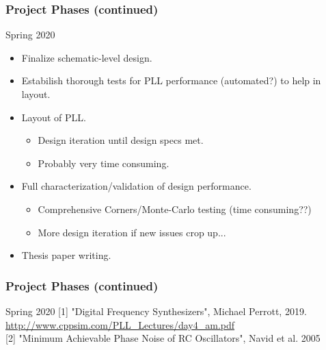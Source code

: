 \documentclass[t, screen, aspectratio=43]{beamer}
\begin{document}
\begin{frame}
	\frametitle{Project Phases (continued)}
	\begin{block}{Spring 2020}
		\begin{itemize}
			\footnotesize
			\item Finalize schematic-level design.
			\item Estabilish thorough tests for PLL performance (automated?) to help in layout.
			\item Layout of PLL.
			\begin{itemize}
				\footnotesize
				\item Design iteration until design specs met.
				\item Probably very time consuming.
			\end{itemize}
			\item Full characterization/validation of design performance. 
			\begin{itemize}
				\footnotesize
				\item Comprehensive Corners/Monte-Carlo testing (time consuming??)
				\item More design iteration if new issues crop up...
			\end{itemize}
			\item Thesis paper writing.
		\end{itemize}
	\end{block}
\end{frame}



\begin{frame}
	\frametitle{Project Phases (continued)}
	\begin{block}{Spring 2020}
		[1] "Digital Frequency Synthesizers", Michael Perrott, 2019.\\
		\hspace{16pt}\url{http://www.cppsim.com/PLL_Lectures/day4_am.pdf}\\
		\vspace{1em}
		[2] "Minimum Achievable Phase Noise of RC Oscillators",
	Navid et al. 2005
	\end{block}
\end{frame}
\end{document}
